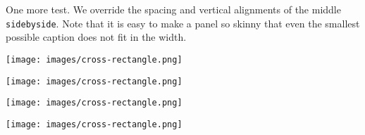\documentclass[10pt,]{article}
\theoremstyle{plain}
\theoremstyle{definition}
\theoremstyle{definition}
\theoremstyle{definition}
\theoremstyle{definition}
\theoremstyle{definition}
\theoremstyle{definition}
\numberwithin{equation}{section}
\newlength{\panelmax}
\begin{document}
\hypertarget{p-734}{}%
One more test.  We override the spacing and vertical alignments of the middle \lstinline?sidebyside?.  Note that it is easy to make a panel so skinny that even the smallest possible caption does not fit in the width.%
{%
\setlength{\panelmax}{0pt}
\ifdefined\panelboxAimage\else\newsavebox{\panelboxAimage}\fi%
\begin{lrbox}{\panelboxAimage}
\texttt{[image: images/cross-rectangle.png]}
\end{lrbox}
\ifdefined\phAimage\else\newlength{\phAimage}\fi%
\setlength{\phAimage}{\ht\panelboxAimage+\dp\panelboxAimage}
\settototalheight{\phAimage}{\usebox{\panelboxAimage}}
\setlength{\panelmax}{\maxof{\panelmax}{\phAimage}}
\ifdefined\panelboxBimage\else\newsavebox{\panelboxBimage}\fi%
\begin{lrbox}{\panelboxBimage}
\texttt{[image: images/cross-rectangle.png]}
\end{lrbox}
\ifdefined\phBimage\else\newlength{\phBimage}\fi%
\setlength{\phBimage}{\ht\panelboxBimage+\dp\panelboxBimage}
\settototalheight{\phBimage}{\usebox{\panelboxBimage}}
\setlength{\panelmax}{\maxof{\panelmax}{\phBimage}}
\ifdefined\panelboxCimage\else\newsavebox{\panelboxCimage}\fi%
\begin{lrbox}{\panelboxCimage}
\texttt{[image: images/cross-rectangle.png]}
\end{lrbox}
\ifdefined\phCimage\else\newlength{\phCimage}\fi%
\setlength{\phCimage}{\ht\panelboxCimage+\dp\panelboxCimage}
\settototalheight{\phCimage}{\usebox{\panelboxCimage}}
\setlength{\panelmax}{\maxof{\panelmax}{\phCimage}}
\ifdefined\panelboxDimage\else\newsavebox{\panelboxDimage}\fi%
\begin{lrbox}{\panelboxDimage}
\texttt{[image: images/cross-rectangle.png]}
\end{lrbox}
\ifdefined\phDimage\else\newlength{\phDimage}\fi%
\setlength{\phDimage}{\ht\panelboxDimage+\dp\panelboxDimage}
\settototalheight{\phDimage}{\usebox{\panelboxDimage}}
\setlength{\panelmax}{\maxof{\panelmax}{\phDimage}}
\leavevmode%
\setlength{\tabcolsep}{0.025\linewidth}
\par\medskip\noindent
\hspace*{0.025\linewidth}%
}
\end{document}
